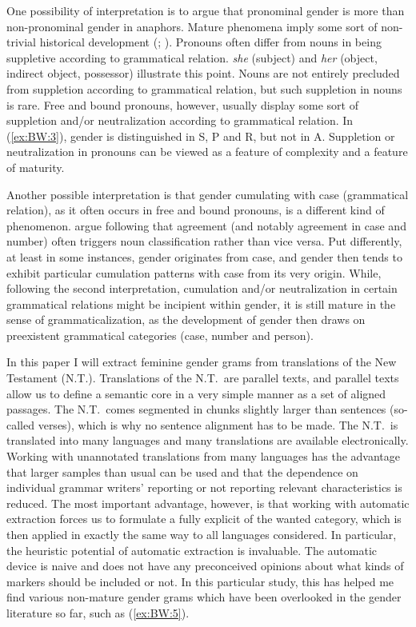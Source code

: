 \documentclass[output=collectionpaper]{langsci/langscibook}
\begin{document}
One possibility of interpretation is to argue that pronominal gender is more  than non-pronominal gender in anaphors. Mature phenomena imply some sort of non-trivial historical development (\citealt[2]{Dahl2004}; \citealt{Trudgill2011}). Pronouns often differ from nouns in being suppletive according to grammatical relation.  \textit{she} (subject) and \textit{her} (object, indirect object, possessor) illustrate this point. Nouns are not entirely precluded from suppletion according to grammatical relation, but such suppletion in nouns is rare. Free and bound pronouns, however, usually display some sort of suppletion and/or neutralization according to grammatical relation. In  (\ref{ex:BW:3}), gender is distinguished in S, P and R, but not in A. Suppletion or neutralization in pronouns can be viewed as a feature of complexity and a feature of maturity.

\largerpage
Another possible interpretation is that gender cumulating with case (grammatical relation), as it often occurs in free and bound pronouns, is a different kind of phenomenon.  argue following \cite[142]{Nichols1992} that agreement (and notably agreement in case and number) often triggers noun classification rather than vice versa. Put differently, at least in some instances, gender originates from case, and gender then tends to exhibit particular cumulation patterns with case from its very origin. While, following the second interpretation, cumulation and/or neutralization in certain grammatical relations might be incipient within gender, it is still mature in the sense of grammaticalization, as the development of gender then draws on preexistent grammatical categories (case, number and person).

In this paper I will extract feminine gender grams from translations of the New Testament (N.T.). Translations of the N.T.\ are parallel texts, and parallel texts allow us to define a semantic core in a very simple manner as a set of aligned passages. The N.T.\ comes segmented in chunks slightly larger than sentences (so-called verses), which is why no sentence alignment has to be made. The N.T.\ is translated into many languages and many translations are available electronically. Working with unannotated translations from many languages has the advantage that larger samples than usual can be used and that the dependence on individual grammar writers’ reporting or not reporting relevant characteristics is reduced. The most important advantage, however, is that working with automatic extraction forces us to formulate a fully explicit  of the wanted category, which is then applied in exactly the same way to all languages considered. In particular, the heuristic potential of automatic extraction is invaluable. The automatic device is naive and does not have any preconceived opinions about what kinds of markers should be included or not. In this particular study, this has helped me find various non-mature gender grams which have been overlooked in the gender literature so far, such as  (\ref{ex:BW:5}).
\end{document}
